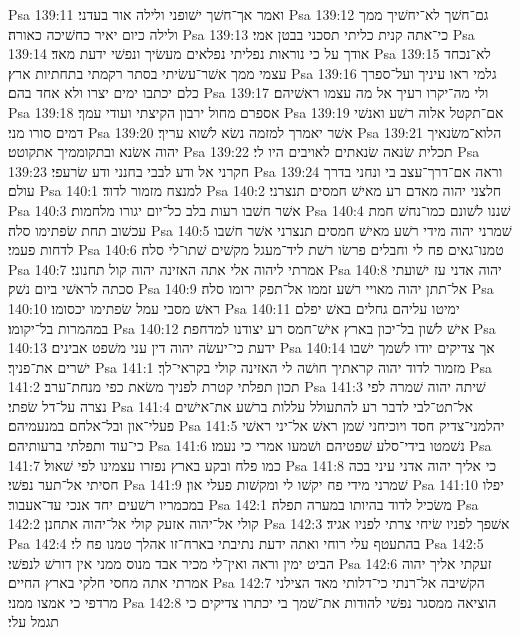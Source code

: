 Psa 139:11  ואמר אך־חשׁך ישׁופני ולילה אור בעדני׃
Psa 139:12  גם־חשׁך לא־יחשׁיך ממך ולילה כיום יאיר כחשׁיכה כאורה׃
Psa 139:13  כי־אתה קנית כליתי תסכני בבטן אמי׃
Psa 139:14  אודך על כי נוראות נפליתי נפלאים מעשׂיך ונפשׁי ידעת מאד׃
Psa 139:15  לא־נכחד עצמי ממך אשׁר־עשׂיתי בסתר רקמתי בתחתיות ארץ׃
Psa 139:16  גלמי ראו עיניך ועל־ספרך כלם יכתבו ימים יצרו ולא אחד בהם׃
Psa 139:17  ולי מה־יקרו רעיך אל מה עצמו ראשׁיהם׃
Psa 139:18  אספרם מחול ירבון הקיצתי ועודי עמך׃
Psa 139:19  אם־תקטל אלוה רשׁע ואנשׁי דמים סורו מני׃
Psa 139:20  אשׁר יאמרך למזמה נשׂא לשׁוא עריך׃
Psa 139:21  הלוא־משׂנאיך יהוה אשׂנא ובתקוממיך אתקוטט׃
Psa 139:22  תכלית שׂנאה שׂנאתים לאויבים היו לי׃
Psa 139:23  חקרני אל ודע לבבי בחנני ודע שׂרעפי׃
Psa 139:24  וראה אם־דרך־עצב בי ונחני בדרך עולם׃
Psa 140:1  למנצח מזמור לדוד׃
Psa 140:2  חלצני יהוה מאדם רע מאישׁ חמסים תנצרני׃
Psa 140:3  אשׁר חשׁבו רעות בלב כל־יום יגורו מלחמות׃
Psa 140:4  שׁננו לשׁונם כמו־נחשׁ חמת עכשׁוב תחת שׂפתימו סלה׃
Psa 140:5  שׁמרני יהוה מידי רשׁע מאישׁ חמסים תנצרני אשׁר חשׁבו לדחות פעמי׃
Psa 140:6  טמנו־גאים פח לי וחבלים פרשׂו רשׁת ליד־מעגל מקשׁים שׁתו־לי סלה׃
Psa 140:7  אמרתי ליהוה אלי אתה האזינה יהוה קול תחנוני׃
Psa 140:8  יהוה אדני עז ישׁועתי סכתה לראשׁי ביום נשׁק׃
Psa 140:9  אל־תתן יהוה מאויי רשׁע זממו אל־תפק ירומו סלה׃
Psa 140:10  ראשׁ מסבי עמל שׂפתימו יכסומו׃
Psa 140:11  ימיטו עליהם גחלים באשׁ יפלם במהמרות בל־יקומו׃
Psa 140:12  אישׁ לשׁון בל־יכון בארץ אישׁ־חמס רע יצודנו למדחפת׃
Psa 140:13  ידעת כי־יעשׂה יהוה דין עני משׁפט אבינים׃
Psa 140:14  אך צדיקים יודו לשׁמך ישׁבו ישׁרים את־פניך׃
Psa 141:1  מזמור לדוד יהוה קראתיך חושׁה לי האזינה קולי בקראי־לך׃
Psa 141:2  תכון תפלתי קטרת לפניך משׂאת כפי מנחת־ערב׃
Psa 141:3  שׁיתה יהוה שׁמרה לפי נצרה על־דל שׂפתי׃
Psa 141:4  אל־תט־לבי לדבר רע להתעולל עללות ברשׁע את־אישׁים פעלי־און ובל־אלחם במנעמיהם׃
Psa 141:5  יהלמני־צדיק חסד ויוכיחני שׁמן ראשׁ אל־יני ראשׁי כי־עוד ותפלתי ברעותיהם׃
Psa 141:6  נשׁמטו בידי־סלע שׁפטיהם ושׁמעו אמרי כי נעמו׃
Psa 141:7  כמו פלח ובקע בארץ נפזרו עצמינו לפי שׁאול׃
Psa 141:8  כי אליך יהוה אדני עיני בכה חסיתי אל־תער נפשׁי׃
Psa 141:9  שׁמרני מידי פח יקשׁו לי ומקשׁות פעלי און׃
Psa 141:10  יפלו במכמריו רשׁעים יחד אנכי עד־אעבור׃
Psa 142:1  משׂכיל לדוד בהיותו במערה תפלה׃
Psa 142:2  קולי אל־יהוה אזעק קולי אל־יהוה אתחנן׃
Psa 142:3  אשׁפך לפניו שׂיחי צרתי לפניו אגיד׃
Psa 142:4  בהתעטף עלי רוחי ואתה ידעת נתיבתי בארח־זו אהלך טמנו פח לי׃
Psa 142:5  הביט ימין וראה ואין־לי מכיר אבד מנוס ממני אין דורשׁ לנפשׁי׃
Psa 142:6  זעקתי אליך יהוה אמרתי אתה מחסי חלקי בארץ החיים׃
Psa 142:7  הקשׁיבה אל־רנתי כי־דלותי מאד הצילני מרדפי כי אמצו ממני׃
Psa 142:8  הוציאה ממסגר נפשׁי להודות את־שׁמך בי יכתרו צדיקים כי תגמל עלי׃
